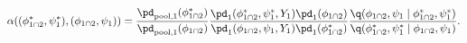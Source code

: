 \begin{equation}
  \alpha((\phi_{1 \cap 2}^{*}, \psi_{1}^{*}), (\phi_{1 \cap 2}, \psi_{1})) = 
  \frac {
    \pd_{\text{pool}, 1}(\phi_{1 \cap 2}^{*})
  } {
    \pd_{\text{pool}, 1}(\phi_{1 \cap 2})
  }
  \frac {
    \pd_{1}(\phi_{1 \cap 2}^{*}, \psi_{1}^{*}, Y_{1})
    \pd_{1}(\phi_{1 \cap 2})
  } {
    \pd_{1}(\phi_{1 \cap 2}, \psi_{1}, Y_{1})
    \pd_{1}(\phi_{1 \cap 2}^{*})
  }
  \frac {
    \q(\phi_{1 \cap 2}, \psi_{1} \mid \phi_{1 \cap 2}^{*}, \psi_{1}^{*})
  } {
    \q(\phi_{1 \cap 2}^{*}, \psi_{1}^{*} \mid \phi_{1 \cap 2}, \psi_{1})
  }.
  \label{eqn:stage-one-acceptance-probability}
\end{equation}